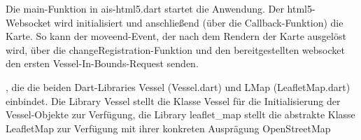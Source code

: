 Die main-Funktion in ais-html5.dart startet die Anwendung. Der html5-Websocket wird initialisiert und anschließend (über die Callback-Funktion) die Karte. So kann der moveend-Event, der nach dem Rendern der Karte ausgelöst wird, über die changeRegistration-Funktion und den bereitgestellten websocket den ersten Vessel-In-Bounds-Request senden.



, die die beiden Dart-Libraries Vessel (Vessel.dart) und LMap (LeafletMap.dart) einbindet. Die Library Vessel stellt die Klasse Vessel für die Initialisierung der Vessel-Objekte zur Verfügung, die Library leaflet\_map stellt die abstrakte Klasse LeafletMap zur Verfügung mit ihrer konkreten Ausprägung OpenStreetMap 

